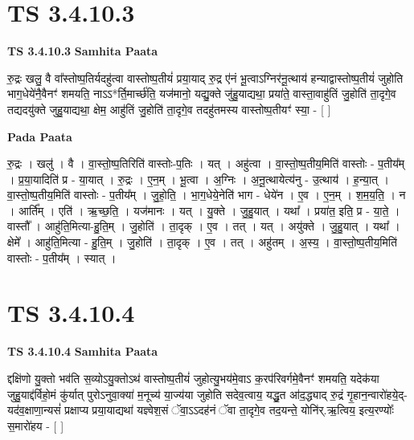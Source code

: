 \documentclass[17pt]{extarticle}
\begin{document}
\section*{ TS 3.4.10.3 }

\textbf{TS 3.4.10.3 } \newline
\textbf{Samhita Paata} \newline

रु॒द्रः खलु॒ वै वा᳚स्तोष्प॒तिर्यदहु॑त्वा वास्तोष्प॒तीयं॑ प्रया॒याद् रु॒द्र ए॑नं भू॒त्वाऽग्निर॑नू॒त्थाय॑ हन्याद्वास्तोष्प॒तीयं॑ जुहोति भाग॒धेये॑नै॒वैनꣳ॑ शमयति॒ नाऽऽ*र्ति॒मार्च्छ॑ति॒ यज॑मानो॒ यद्यु॒क्ते जु॑हु॒याद्यथा॒ प्रया॑ते॒ वास्ता॒वाहु॑तिं जु॒होति॑ ता॒दृगे॒व तद्यदयु॑क्ते जुहु॒याद्यथा॒ क्षेम॒ आहु॑तिं जु॒होति॑ ता॒दृगे॒व तदहु॑तमस्य वास्तोष्प॒तीयꣳ॑ स्या॒ - [  ] \newline

\textbf{Pada Paata} \newline

रु॒द्रः । खलु॑ । वै । वा॒स्तो॒ष्प॒तिरिति॑ वास्तोः-प॒तिः । यत् । अहु॑त्वा । वा॒स्तो॒ष्प॒तीय॒मिति॑ वास्तोः - प॒तीय᳚म् । प्र॒या॒यादिति॑ प्र - या॒यात् । रु॒द्रः । ए॒न॒म् । भू॒त्वा । अ॒ग्निः । अ॒नू॒त्थायेत्य॑नु - उ॒त्थाय॑ । ह॒न्या॒त् । वा॒स्तो॒ष्प॒तीय॒मिति॑ वास्तोः - प॒तीय᳚म् । जु॒हो॒ति॒ । भा॒ग॒धेये॒नेति॑ भाग - धेये॑न । ए॒व । ए॒न॒म् । श॒म॒य॒ति॒ । न । आर्ति᳚म् । एति॑ । ऋ॒च्छ॒ति॒ । यज॑मानः । यत् । यु॒क्ते । जु॒हु॒यात् । यथा᳚ । प्रया॑त॒ इति॒ प्र - या॒ते॒ । वास्तौ᳚ । आहु॑ति॒मित्या-हु॒ति॒म् । जु॒होति॑ । ता॒दृक् । ए॒व । तत् । यत् । अयु॑क्ते । जु॒हु॒यात् । यथा᳚ । क्षेमे᳚ । आहु॑ति॒मित्या - हु॒ति॒म् । जु॒होति॑ । ता॒दृक् । ए॒व । तत् । अहु॑तम् । अ॒स्य॒ । वा॒स्तो॒ष्प॒तीय॒मिति॑ वास्तोः - प॒तीय᳚म् । स्यात् ।  \newline




\section*{ TS 3.4.10.4 }

\textbf{TS 3.4.10.4 } \newline
\textbf{Samhita Paata} \newline

द्दक्षि॑णो यु॒क्तो भव॑ति स॒व्योऽयु॒क्तोऽथ॑ वास्तोष्प॒तीयं॑ जुहोत्यु॒भय॑मे॒वाऽ क॒रप॑रिवर्गमे॒वैनꣳ॑ शमयति॒ यदेक॑या जुहु॒याद्द॑र्विहो॒मं कु॑र्यात् पुरोऽनुवा॒क्या॑ म॒नूच्य॑ या॒ज्य॑या जुहोति सदेव॒त्वाय॒ यद्धु॒त आ॑द॒द्ध्याद् रु॒द्रं गृ॒हान॒न्वारो॑हये॒द्-यद॑व॒क्षाणा॒न्यसं॑ प्रक्षाप्य प्रया॒याद्यथा॑ यज्ञ्वेश॒सं ॅवा॒ऽऽदह॑नं ॅवा ता॒दृगे॒व तद॒यन्ते॒ योनि॑र्.ऋ॒त्विय॒ इत्य॒रण्योः᳚ स॒मारो॑हय - [  ] \newline
\end{document}
